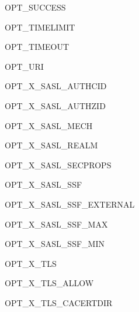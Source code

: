 \begin{datadesc}{OPT_SUCCESS}
\end{datadesc}

\begin{datadesc}{OPT_TIMELIMIT}
\end{datadesc}

\begin{datadesc}{OPT_TIMEOUT}
\end{datadesc}

\begin{datadesc}{OPT_URI}
\end{datadesc}

\begin{datadesc}{OPT_X_SASL_AUTHCID}
\end{datadesc}

\begin{datadesc}{OPT_X_SASL_AUTHZID}
\end{datadesc}

\begin{datadesc}{OPT_X_SASL_MECH}
\end{datadesc}

\begin{datadesc}{OPT_X_SASL_REALM}
\end{datadesc}

\begin{datadesc}{OPT_X_SASL_SECPROPS}
\end{datadesc}

\begin{datadesc}{OPT_X_SASL_SSF}
\end{datadesc}

\begin{datadesc}{OPT_X_SASL_SSF_EXTERNAL}
\end{datadesc}

\begin{datadesc}{OPT_X_SASL_SSF_MAX}
\end{datadesc}

\begin{datadesc}{OPT_X_SASL_SSF_MIN}
\end{datadesc}

\begin{datadesc}{OPT_X_TLS}
\end{datadesc}

\begin{datadesc}{OPT_X_TLS_ALLOW}
\end{datadesc}

\begin{datadesc}{OPT_X_TLS_CACERTDIR}
\end{datadesc}

